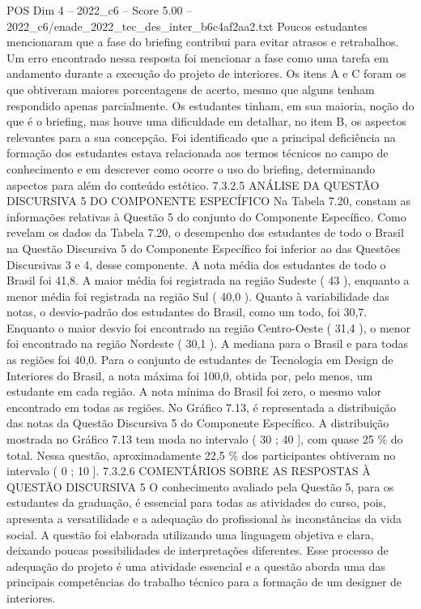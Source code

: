 \begin{textsample}{POS Dim 4 – 2022\_c6 – Score 5.00 – 2022\_c6/enade\_2022\_tec\_des\_inter\_b6c4af2aa2.txt}
Poucos estudantes mencionaram que a fase do briefing contribui para evitar atrasos e retrabalhos.
Um erro encontrado nessa resposta foi mencionar a fase como uma tarefa em andamento durante a execução do projeto de interiores.
Os itens A e C foram os que obtiveram maiores porcentagens de acerto, mesmo que alguns tenham respondido apenas parcialmente.
Os estudantes tinham, em sua maioria, noção do que é o briefing, mas houve uma dificuldade em detalhar, no item B, os aspectos relevantes para a sua concepção.
Foi identificado que a principal deficiência na formação dos estudantes estava relacionada aos termos técnicos no campo de conhecimento e em descrever como ocorre o uso do briefing, determinando aspectos para além do conteúdo estético. 7.3.2.5 ANÁLISE DA QUESTÃO DISCURSIVA 5 DO COMPONENTE ESPECÍFICO Na Tabela 7.20, constam as informações relativas à Questão 5 do conjunto do Componente Específico.
Como revelam os dados da Tabela 7.20, o desempenho dos estudantes de todo o Brasil na Questão Discursiva 5 do Componente Específico foi inferior ao das Questões Discursivas 3 e 4, desse componente.
A nota média dos estudantes de todo o Brasil foi 41,8.
A maior média foi registrada na região Sudeste ( 43 ), enquanto a menor média foi registrada na região Sul ( 40,0 ).
Quanto à variabilidade das notas, o desvio-padrão dos estudantes do Brasil, como um todo, foi 30,7.
Enquanto o maior desvio foi encontrado na região Centro-Oeste ( 31,4 ), o menor foi encontrado na região Nordeste ( 30,1 ).
A mediana para o Brasil e para todas as regiões foi 40,0.
Para o conjunto de estudantes de Tecnologia em Design de Interiores do Brasil, a nota máxima foi 100,0, obtida por, pelo menos, um estudante em cada região.
A nota mínima do Brasil foi zero, o mesmo valor encontrado em todas as regiões.
No Gráfico 7.13, é representada a distribuição das notas da Questão Discursiva 5 do Componente Específico.
A distribuição mostrada no Gráfico 7.13 tem moda no intervalo ( 30 ; 40 ], com quase 25 \% do total.
Nessa questão, aproximadamente 22,5 \% dos participantes obtiveram no intervalo ( 0 ; 10 ]. 7.3.2.6 COMENTÁRIOS SOBRE AS RESPOSTAS À QUESTÃO DISCURSIVA 5 O conhecimento avaliado pela Questão 5, para os estudantes da graduação, é essencial para todas as atividades do curso, pois, apresenta a versatilidade e a adequação do profissional às inconstâncias da vida social.
A questão foi elaborada utilizando uma linguagem objetiva e clara, deixando poucas possibilidades de interpretações diferentes.
Esse processo de adequação do projeto é uma atividade essencial e a questão aborda uma das principais competências do trabalho técnico para a formação de um designer de interiores.

\end{textsample}
